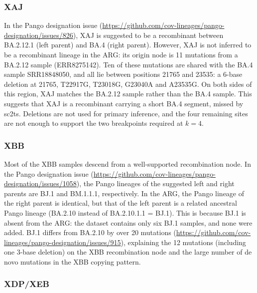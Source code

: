 \documentclass[12pt]{article}
\begin{document}
\subsubsection{XAJ}
\label{sec:dd_xaj}

In the Pango designation issue
(\url{https://github.com/cov-lineages/pango-designation/issues/826}),
XAJ is suggested to be a recombinant between
BA.2.12.1 (left parent) and BA.4 (right parent).
However, XAJ is not inferred to be a recombinant lineage in the ARG:
its origin node is 11 mutations from a BA.2.12 sample (ERR8275142).
Ten of these mutations are shared with the BA.4 sample SRR18848050,
and all lie between positions 21765 and 23535:
a 6-base deletion at 21765, T22917G, T23018G, G23040A and A23535G.
On both sides of this region, XAJ matches the BA.2.12 sample rather than the BA.4 sample.
This suggests that XAJ is a recombinant carrying a short BA.4 segment,
missed by sc2ts.
Deletions are not used for primary inference,
and the four remaining sites are not enough
to support the two breakpoints required at $k=4$.

\subsubsection{XBB}
\label{sec:dd_xbb}

Most of the XBB samples descend from a well-supported recombination node.
In the Pango designation issue
(\url{https://github.com/cov-lineages/pango-designation/issues/1058}),
the Pango lineages of the suggested left and right parents are
BJ.1 and BM.1.1.1, respectively.
In the ARG, the Pango lineage of the right parent is identical,
but that of the left parent is a related ancestral Pango lineage
(BA.2.10 instead of BA.2.10.1.1 = BJ.1).
This is because BJ.1 is absent from the ARG:
the dataset contains only six BJ.1 samples, and none were added.
BJ.1 differs from BA.2.10 by over 20 mutations
(\url{https://github.com/cov-lineages/pango-designation/issues/915}),
explaining the 12 mutations (including one 3-base deletion)
on the XBB recombination node
and the large number of de novo mutations
in the XBB copying pattern.

\subsubsection{XDP/XEB}
\label{sec:dd_xdp}
\end{document}

